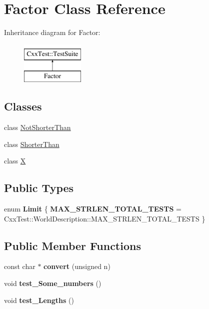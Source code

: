 \hypertarget{classFactor}{\section{Factor Class Reference}
\label{classFactor}
}
Inheritance diagram for Factor\-:\begin{figure}[H]
\begin{center}
\leavevmode
\includegraphics[height=2.000000cm]{classFactor}
\end{center}
\end{figure}
\subsection*{Classes}
\begin{DoxyCompactItemize}
\item 
class \hyperlink{classFactor_1_1NotShorterThan}{Not\-Shorter\-Than}
\item 
class \hyperlink{classFactor_1_1ShorterThan}{Shorter\-Than}
\item 
class \hyperlink{classFactor_1_1X}{X}
\end{DoxyCompactItemize}
\subsection*{Public Types}
\begin{DoxyCompactItemize}
\item 
enum {\bfseries Limit} \{ {\bfseries M\-A\-X\-\_\-\-S\-T\-R\-L\-E\-N\-\_\-\-T\-O\-T\-A\-L\-\_\-\-T\-E\-S\-T\-S} = Cxx\-Test\-:\-:World\-Description\-:\-:M\-A\-X\-\_\-\-S\-T\-R\-L\-E\-N\-\_\-\-T\-O\-T\-A\-L\-\_\-\-T\-E\-S\-T\-S
 \}
\end{DoxyCompactItemize}
\subsection*{Public Member Functions}
\begin{DoxyCompactItemize}
\item 
\hypertarget{classFactor_a7426118def38f980381e4e75c957f379}{const char $\ast$ {\bfseries convert} (unsigned n)}\label{classFactor_a7426118def38f980381e4e75c957f379}

\item 
\hypertarget{classFactor_a16ce4aaaab92583bbf5efb8952c06300}{void {\bfseries test\-\_\-\-Some\-\_\-numbers} ()}\label{classFactor_a16ce4aaaab92583bbf5efb8952c06300}

\item 
\hypertarget{classFactor_a1f67372f5381a94672cdfce3e6e22d38}{void {\bfseries test\-\_\-\-Lengths} ()}\label{classFactor_a1f67372f5381a94672cdfce3e6e22d38}

\end{DoxyCompactItemize}
